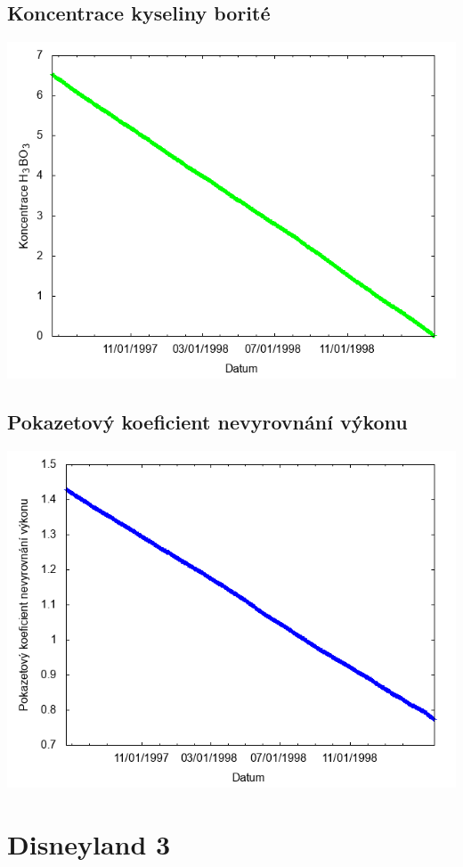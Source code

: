 \documentclass[a4paper,twoside,11pt]{article}
\begin{document}
\subsection*{Koncentrace kyseliny borité}
\begin{center}
\includegraphics[width=.8\textwidth]{graphs/Disneyland_02_bc.png}
\end{center}

\subsection*{Pokazetový koeficient nevyrovnání výkonu}
\begin{center}
\includegraphics[width=.8\textwidth]{graphs/Disneyland_02_fha.png}
\end{center}

\newpage
\section*{Disneyland 3}
\end{document}
